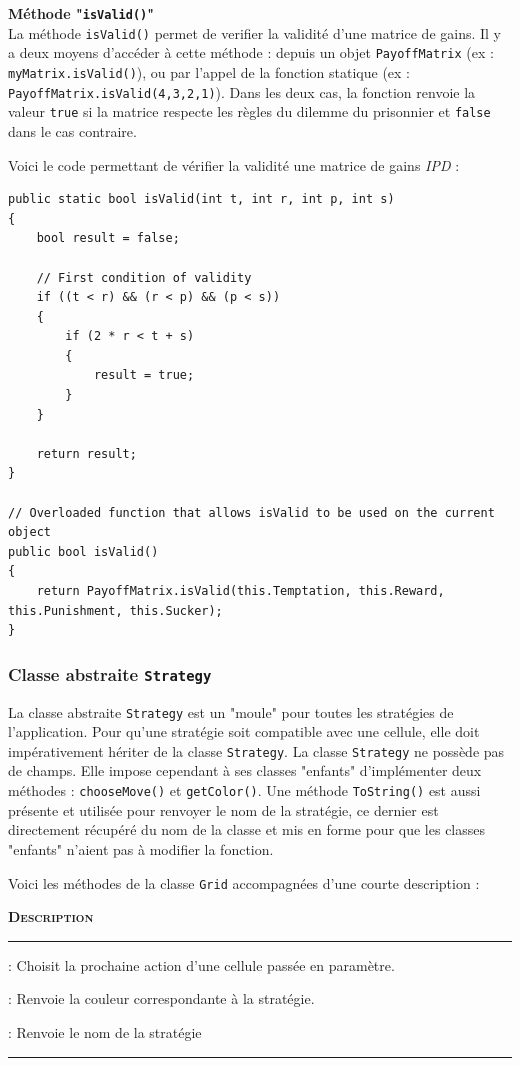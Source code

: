 \documentclass[a4paper, french]{article}
\begin{document}
\textbf{Méthode "\texttt{isValid()}"}\\
La méthode \texttt{isValid()} permet de verifier la validité d'une matrice de gains. Il y a deux moyens d'accéder à cette méthode : depuis un objet \texttt{PayoffMatrix} (ex : \texttt{myMatrix.isValid()}), ou par l'appel de la fonction statique (ex : \texttt{PayoffMatrix.isValid(4,3,2,1)}). Dans les deux cas, la fonction renvoie la valeur \texttt{true} si la matrice respecte les règles du dilemme du prisonnier et \texttt{false} dans le cas contraire.

Voici le code permettant de vérifier la validité une matrice de gains \textit{IPD} :
\begin{lstlisting}
public static bool isValid(int t, int r, int p, int s)
{
    bool result = false;

    // First condition of validity
    if ((t < r) && (r < p) && (p < s))
    {
        if (2 * r < t + s)
        {
            result = true;
        }
    }

    return result;
}

// Overloaded function that allows isValid to be used on the current object
public bool isValid()
{
    return PayoffMatrix.isValid(this.Temptation, this.Reward, this.Punishment, this.Sucker);
}
\end{lstlisting}

\pagebreak
\subsubsection{Classe abstraite \texttt{Strategy}}
La classe abstraite \texttt{Strategy} est un "moule" pour toutes les stratégies de l'application. Pour qu'une stratégie soit compatible avec une cellule, elle doit impérativement hériter de la classe \texttt{Strategy}. La classe \texttt{Strategy} ne possède pas de champs. Elle impose cependant à ses classes "enfants" d'implémenter deux méthodes : \texttt{chooseMove()} et \texttt{getColor()}. Une méthode \texttt{ToString()} est aussi présente et utilisée pour renvoyer le nom de la stratégie, ce dernier est directement récupéré du nom de la classe et mis en forme pour que les classes "enfants" n'aient pas à modifier la fonction.

Voici les méthodes de la classe \texttt{Grid} accompagnées d'une courte description : 
\vspace{0.25cm}
\begin{description}[labelwidth=4cm]
    \small
    \item[\textbf{\textsc{Méthode}}] \textbf{\textsc{Description}}
    \vspace{0.1cm}
    \hrule{}
    \item[\texttt{chooseMove()}] : Choisit la prochaine action d'une cellule passée en paramètre.
    \item[\texttt{getColor()}]   : Renvoie la couleur correspondante à la stratégie.
    \item[\texttt{ToString()}]   : Renvoie le nom de la stratégie
\end{description}
\vspace{0.25cm}
\hrule{}
\vspace{0.5cm}
\end{document}
